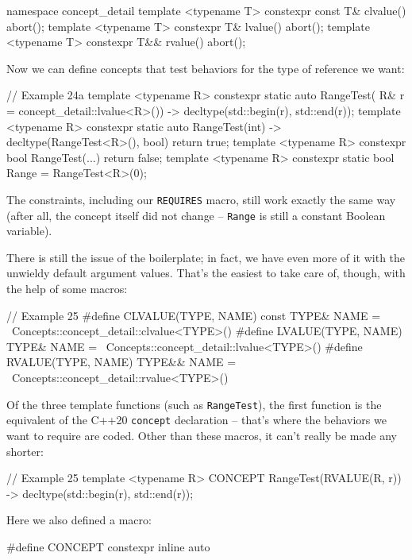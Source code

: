 \begin{code}
namespace concept_detail {
template <typename T>
  constexpr const T& clvalue() { abort(); }
template <typename T> constexpr T& lvalue() { abort(); }
template <typename T> constexpr T&& rvalue() { abort(); }
}
\end{code}

Now we can define concepts that test behaviors for the type of reference we want:

\begin{code}
// Example 24a
template <typename R>
constexpr static auto RangeTest(
  R& r = concept_detail::lvalue<R>()) ->
  decltype(std::begin(r), std::end(r));
template <typename R>
constexpr static auto RangeTest(int) ->
  decltype(RangeTest<R>(), bool{}) { return true; }
template <typename R>
constexpr bool RangeTest(...) { return false; }
template <typename R>
constexpr static bool Range = RangeTest<R>(0);
\end{code}

The constraints, including our \texttt{REQUIRES} macro, still work exactly the same way (after all, the concept itself did not change -- \texttt{Range} is still a constant Boolean variable).

There is still the issue of the boilerplate; in fact, we have even more of it with the unwieldy default argument values. That's the easiest to take care of, though, with the help of some macros:

\begin{code}
// Example 25
#define CLVALUE(TYPE, NAME) const TYPE& NAME = \
  Concepts::concept_detail::clvalue<TYPE>()
#define LVALUE(TYPE, NAME) TYPE& NAME = \
  Concepts::concept_detail::lvalue<TYPE>()
#define RVALUE(TYPE, NAME) TYPE&& NAME = \
  Concepts::concept_detail::rvalue<TYPE>()
\end{code}

Of the three template functions (such as \texttt{RangeTest}), the first function is the equivalent of the C++20 \texttt{concept} declaration -- that's where the behaviors we want to require are coded. Other than these macros, it can't really be made any shorter:

\begin{code}
// Example 25
template <typename R> CONCEPT RangeTest(RVALUE(R, r)) ->
  decltype(std::begin(r), std::end(r));
\end{code}

Here we also defined a macro:

\begin{code}
#define CONCEPT constexpr inline auto
\end{code}


